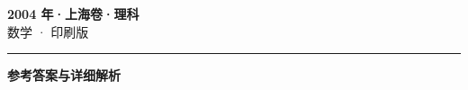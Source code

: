 \documentclass[zihao=5, a4paper]{ctexart}
\begin{document}
\begin{center}
  {\Large\bfseries 2004 年·上海卷·理科}\\[4pt]
  {\large 数学 · 印刷版}
\end{center}
\medskip
{}

\par\bigskip\hrule\bigskip
{}
\begin{center}{\large\bfseries 参考答案与详细解析}\end{center}
\smallskip

\end{document}
